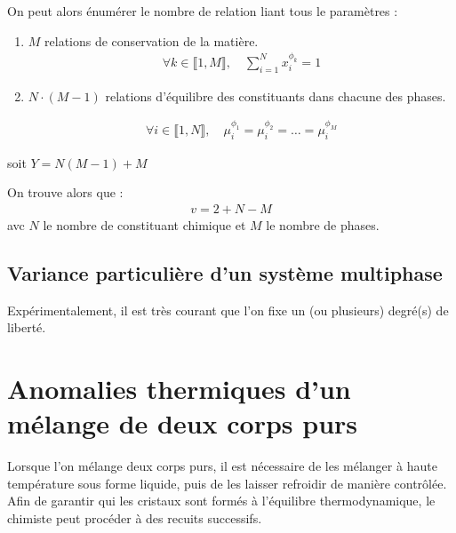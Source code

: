 \documentclass[a4paper,16pt]{book}
\begin{document}
On peut alors énumérer le nombre de relation liant tous le paramètres : 
\begin{enumerate}
\item $M$ relations de conservation de la matière.
\begin{align*}
\forall k \in \llbracket 1, M \rrbracket, \quad \sum_{i = 1}^N x_i^{\phi_k} = 1
\end{align*}

\item $N \cdot (M-1)$ relations d'équilibre des constituants dans chacune des phases.

\begin{align*}
\forall i \in \llbracket 1, N \rrbracket, \quad \mu_i^{\phi_1} = \mu_i^{\phi_2} = \ldots =  \mu_i^{\phi_M}
\end{align*}

\end{enumerate}

soit $Y = N (M-1) + M$

On trouve alors que : 
\begin{align*}
v = 2 + N - M
\end{align*}
avc $N$ le nombre de constituant chimique et $M$ le nombre de phases.


\subsection{Variance particulière d'un système multiphase}
Expérimentalement, il est très courant que l'on fixe un (ou plusieurs) degré(s) de liberté.	


\section{Anomalies thermiques d'un mélange de deux corps purs}

Lorsque l'on mélange deux corps purs, il est nécessaire de les mélanger à haute température sous forme liquide, puis de les laisser refroidir de manière contrôlée. Afin de garantir qui les cristaux sont formés à l'équilibre thermodynamique, le chimiste peut procéder à des recuits successifs.
\end{document}
